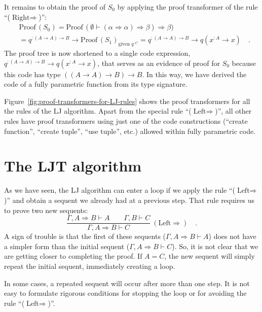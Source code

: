 It remains to obtain the proof of $S_{0}$ by applying the proof transformer
of the rule \textsf{``}($\text{Right}\Rightarrow$)\textsf{''}:
\begin{align*}
 & \text{Proof}\,(S_{0})=\text{Proof}\,(\emptyset\vdash(\alpha\Rightarrow\alpha)\Rightarrow\beta)\Rightarrow\beta)\\
 & =q^{:(A\rightarrow A)\rightarrow B}\rightarrow\text{Proof}\,(S_{1})_{\text{given }q^{:C}}=q^{:(A\rightarrow A)\rightarrow B}\rightarrow q(x^{:A}\rightarrow x)\quad.
\end{align*}
The proof tree is now shortened to a single code expression, $q^{:(A\rightarrow A)\rightarrow B}\rightarrow q(x^{:A}\rightarrow x)$,
that serves as an evidence of proof for $S_{0}$ because this code
has type $\left(\left(A\rightarrow A\right)\rightarrow B\right)\rightarrow B$.
In this way, we have derived the code of a fully parametric function
from its type signature.

Figure~\ref{fig:proof-transformers-for-LJ-rules} shows the proof
transformers for all the rules of the LJ algorithm. Apart from the
special rule \textsf{``}($\text{Left}\Rightarrow$)\textsf{''}, all other rules have
proof transformers using just one of the code constructions (\textsf{``}create
function\textsf{''}, \textsf{``}create tuple\textsf{''}, \textsf{``}use tuple\textsf{''}, etc.) allowed within
fully parametric code.

\section{The LJT algorithm}

As we have seen, the LJ algorithm can enter a loop if we apply the
rule \textsf{``}($\text{Left}\Rightarrow$)\textsf{''} and obtain a sequent we already
had at a previous step. That rule requires us to prove two new sequents:
\[
\frac{\Gamma,A\Rightarrow B\vdash A\quad\quad\Gamma,B\vdash C}{\Gamma,A\Rightarrow B\vdash C}~(\text{Left}\Rightarrow)\quad.
\]
A sign of trouble is that the first of these sequents ($\Gamma,A\Rightarrow B\vdash A$)
does not have a simpler form than the initial sequent ($\Gamma,A\Rightarrow B\vdash C$).
So, it is not clear that we are getting closer to completing the proof.
If $A=C$, the new sequent will simply repeat the initial sequent,
immediately creating a loop.

In some cases, a repeated sequent will occur after more than one step.
It is not easy to formulate rigorous conditions for stopping the loop
or for avoiding the rule \textsf{``}($\text{Left}\Rightarrow$)\textsf{''}.

